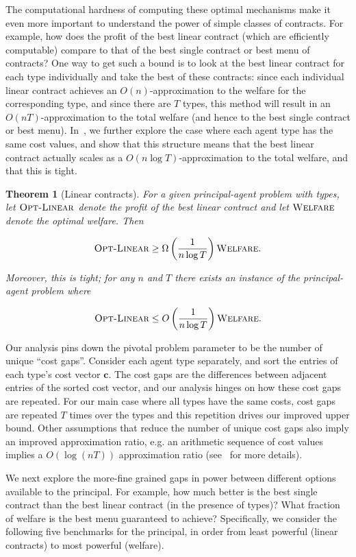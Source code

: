 \documentclass{article}
\newtheorem{theorem}{Theorem}
\newcommand{\CostVector}{\bm{c}}
\newcommand{\OWelfare}{\textsc{Welfare}}
\newcommand{\OLinear}{\textsc{Opt-Linear}}
\begin{document}
The computational hardness of computing these optimal mechanisms make it even more important to understand the power of simple classes of contracts. For example, how does the profit of the best linear contract (which are efficiently computable) compare to that of the best single contract or best menu of contracts? One way to get such a bound is to look at the best linear contract for each type individually and take the best of these contracts: since each individual linear contract achieves an $O(n)$-approximation to the welfare for the corresponding type, and since there are $T$ types, this method will result in an $O(nT)$-approximation to the total welfare (and hence to the best single contract or best menu). In~, we further explore the case where each agent type has the same cost values, and show that this structure means that the best linear contract actually scales as a $O(n \log T)$-approximation to the total welfare, and that this is tight.


\begin{theorem}[Linear contracts]\label{thm:linear_main}
For a given principal-agent problem with types, let $\OLinear$ denote the profit of the best linear contract and let $\OWelfare$ denote the optimal welfare. Then

$$\OLinear \ge \Omega\left(\frac{1}{n\log T}\right)\OWelfare.$$

Moreover, this is tight; for any $n$ and $T$ there exists an instance of the principal-agent problem where 

$$\OLinear \le O\left(\frac{1}{n\log T}\right)\OWelfare.$$
\end{theorem}

Our analysis pins down the pivotal problem parameter to be the number of unique ``cost gaps''. Consider each agent type separately, and sort the entries of each type's cost vector $\CostVector$. The cost gaps are the differences between adjacent entries of the sorted cost vector, and our analysis hinges on how these cost gaps are repeated. For our main case where all types have the same costs, cost gaps are repeated $T$ times over the types and this repetition drives our improved upper bound. 
Other assumptions that reduce the number of unique cost gaps also imply an improved approximation ratio, e.g. an arithmetic sequence of cost values implies a $O(\log(nT))$ approximation ratio (see~ for more details).


We next explore the more-fine grained gaps in power between different options available to the principal. For example, how much better is the best single contract than the best linear contract (in the presence of types)? What fraction of welfare is the best menu guaranteed to achieve? Specifically, we consider the following five benchmarks for the principal, in order from least powerful (linear contracts) to most powerful (welfare). 
\end{document}
